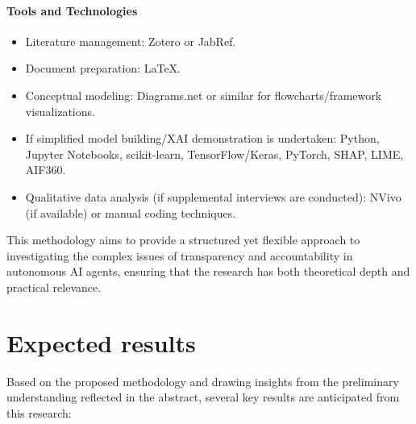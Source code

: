 \documentclass[english]{hogent-article}
\begin{document}
\paragraph{Tools and Technologies}
\begin{itemize}
    \item Literature management: Zotero or JabRef.
    \item Document preparation: LaTeX.
    \item Conceptual modeling: Diagrams.net or similar for flowcharts/framework visualizations.
    \item If simplified model building/XAI demonstration is undertaken: Python, Jupyter Notebooks, scikit-learn, TensorFlow/Keras, PyTorch, SHAP, LIME, AIF360.
    \item Qualitative data analysis (if supplemental interviews are conducted): NVivo (if available) or manual coding techniques.
\end{itemize}

This methodology aims to provide a structured yet flexible approach to investigating the complex issues of transparency and accountability in autonomous AI agents, ensuring that the research has both theoretical depth and practical relevance.


\section{Expected results}%
\label{sec:expected-results}

Based on the proposed methodology and drawing insights from the preliminary understanding reflected in the abstract, several key results are anticipated from this research:
\end{document}
